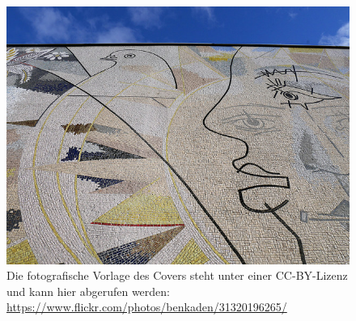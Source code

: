 \documentclass[a4paper,
fontsize=11pt,
oneside,
numbers=noperiodatend,
parskip=half-,
bibliography=totoc,
final
]{scrartcl}
\begin{document}
\begin{figure}
\centering
\includegraphics{abbildung.jpg}
\caption{Die fotografische Vorlage des Covers steht unter einer
CC-BY-Lizenz und kann hier abgerufen werden:
\url{https://www.flickr.com/photos/benkaden/31320196265/}}
\end{figure}

\end{document}
